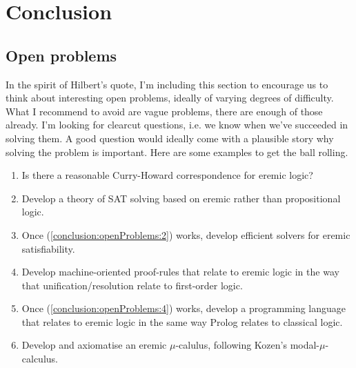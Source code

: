 \section{Conclusion}\label{conclusion}



\subsection{Open problems} In the spirit of Hilbert's quote, I'm including this
section to encourage us to think about interesting open problems,
ideally of varying degrees of difficulty. What I recommend to avoid
are vague problems, there are enough of those already. I'm looking for
clearcut questions, i.e. we know when we've succeeded in solving them.
A good question would ideally come with a plausible story why solving
the problem is important.  Here are some examples to get the ball
rolling.

\begin{enumerate}

\item Is there a reasonable Curry-Howard correspondence for eremic
  logic?

\item\label{conclusion:openProblems:2}  Develop a theory of SAT solving based on eremic rather than
  propositional logic.

\item Once (\ref{conclusion:openProblems:2}) works, develop efficient
  solvers for eremic satisfiability.

\item\label{conclusion:openProblems:4} Develop machine-oriented proof-rules that relate to eremic logic
  in the way that unification/resolution relate to first-order logic.

\item Once (\ref{conclusion:openProblems:4}) works, develop a
  programming language that relates to eremic logic in the same way
  Prolog relates to classical logic.

\item Develop and axiomatise an eremic $\mu$-calulus, following
  Kozen's modal-$\mu$-calculus.

\end{enumerate}
